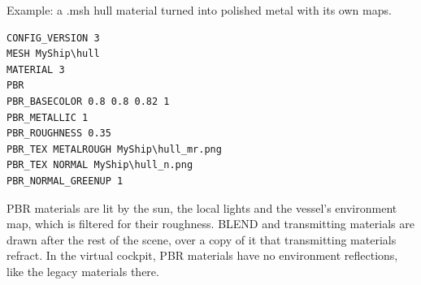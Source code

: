 \documentclass[Orbiter Developer Manual.tex]{subfiles}
\begin{document}
\begin{sloppypar}
\noindent
Example: a .msh hull material turned into polished metal with its own maps.

\begin{lstlisting}[language=OSFS]
CONFIG_VERSION 3
MESH MyShip\hull
MATERIAL 3
PBR
PBR_BASECOLOR 0.8 0.8 0.82 1
PBR_METALLIC 1
PBR_ROUGHNESS 0.35
PBR_TEX METALROUGH MyShip\hull_mr.png
PBR_TEX NORMAL MyShip\hull_n.png
PBR_NORMAL_GREENUP 1
\end{lstlisting}

\noindent
PBR materials are lit by the sun, the local lights and the vessel's environment map, which is filtered for their roughness. BLEND and transmitting materials are drawn after the rest of the scene, over a copy of it that transmitting materials refract. In the virtual cockpit, PBR materials have no environment reflections, like the legacy materials there.



\end{sloppypar}
\end{document}
